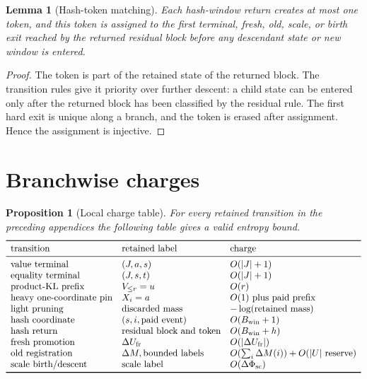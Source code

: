 \documentclass[11pt]{article}
\newtheorem{lemma}[theorem]{Lemma}
\newtheorem{proposition}[theorem]{Proposition}
\theoremstyle{remark}
\newcommand{\fr}{\mathrm{fr}}
\newcommand{\scal}{\mathrm{sc}}
\begin{document}
\begin{lemma}[Hash-token matching]\label{lem:app-token}
Each hash-window return creates at most one token, and this token is assigned to the first terminal, fresh, old, scale, or birth exit reached by the returned residual block before any descendant state or new window is entered.
\end{lemma}

\begin{proof}
The token is part of the retained state of the returned block.  The transition rules give it priority over further descent: a child state can be entered only after the returned block has been classified by the residual rule.  The first hard exit is unique along a branch, and the token is erased after assignment.  Hence the assignment is injective.
\end{proof}

\section{Branchwise charges}\label{app:charges}

\begin{proposition}[Local charge table]\label{prop:app-local-charge-table}
For every retained transition in the preceding appendices the following table gives a valid entropy bound.
\[
\begin{array}{lll}
\toprule
\hbox{transition} & \hbox{retained label} & \hbox{charge}\\
\midrule
\hbox{value terminal} & (J,a,s) & O(|J|+1)\\
\hbox{equality terminal} & (J,s,t) & O(|J|+1)\\
\hbox{product-KL prefix} & V_{\le r}=u & O(r)\\
\hbox{heavy one-coordinate pin} & X_i=a & O(1)\hbox{ plus paid prefix}\\
\hbox{light pruning} & \hbox{discarded mass} & -\log(\hbox{retained mass})\\
\hbox{hash coordinate} & (s,i,\hbox{paid event}) & O(B_{\rm win}+1)\\
\hbox{hash return} & \hbox{residual block and token} & O(B_{\rm win}+h)\\
\hbox{fresh promotion} & \Delta U_{\fr} & O(|\Delta U_{\fr}|)\\
\hbox{old registration} & \Delta M,\hbox{bounded labels} & O(\sum_i\Delta M(i))+O(|U|\hbox{ reserve})\\
\hbox{scale birth/descent} & \hbox{scale label} & O(\Delta\Phi_{\scal})\\
\bottomrule
\end{array}
\]
\end{proposition}
\end{document}
